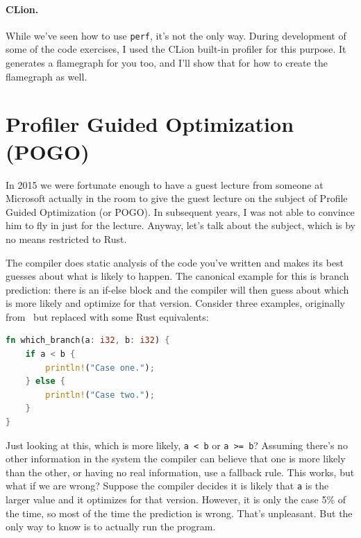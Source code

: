 \documentclass[a4paper]{report}
\begin{document}
\paragraph{CLion.} While we've seen how to use \texttt{perf}, it's not the only way. During development of some of the code exercises, I used the CLion built-in profiler for this purpose. It generates a flamegraph for you too, and I'll show that for how to create the flamegraph as well.

\section*{Profiler Guided Optimization (POGO)}

In 2015 we were fortunate enough to have a guest lecture from someone at Microsoft actually in the room to give the guest lecture on the subject of Profile Guided Optimization (or POGO). In subsequent years, I was not able to convince him to fly in just for the lecture. Anyway, let's talk about the subject, which is by no means restricted to Rust.

The compiler does static analysis of the code you've written and makes its best guesses about what is likely to happen. The canonical example for this is branch prediction: there is an if-else block and the compiler will then guess about which is more likely and optimize for that version. Consider three examples, originally from~\cite{pogo} but replaced with some Rust equivalents:

\begin{lstlisting}[language=Rust]
fn which_branch(a: i32, b: i32) {
    if a < b {
        println!("Case one.");
    } else {
        println!("Case two.");
    }
}
\end{lstlisting}

Just looking at this, which is more likely, \texttt{a < b} or \texttt{a >= b}? Assuming there's no other information in the system the compiler can believe that one is more likely than the other, or having no real information, use a fallback rule. This works, but what if we are wrong? Suppose the compiler decides it is likely that \texttt{a} is the larger value and it optimizes for that version. However, it is only the case 5\% of the time, so most of the time the prediction is wrong. That's unpleasant. But the only way to know is to actually run the program.
\end{document}
